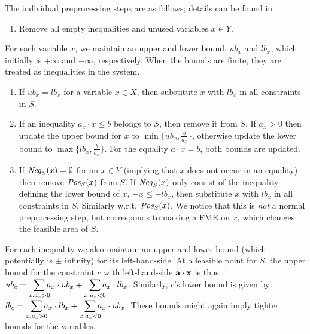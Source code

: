 The individual preprocessing steps are as follows; details can be found in \cite{MyTechRep}.
%
\begin{enumerate} \itemsep0em
	\item Remove all empty inequalities and unused variables $x\in Y$.
\setcounter{counterName}{\value{enumi}}
\end{enumerate}
For each variable $x$, we maintain an upper and lower bound, $ub_x$ and $lb_x$, which initially is $+\infty$ and $-\infty$, respectively. When the bounds are finite, they are treated as inequalities in the system.
\begin{enumerate} \itemsep0em
\setcounter{enumi}{\value{counterName}}
	\item If $ub_x = lb_x$ for a variable $x\in X$, then substitute $x$ with $lb_x$ in all constraints in $S$. 
	\item If an inequality $a_x\cdot x \leq b$ belongs to $S$, then remove it from $S$. If $a_x>0$ then update the upper bound for $x$ to $\min\{ub_x,\frac{b}{a_x}\}$, otherwise update the lower bound to $\max\{lb_x,\frac{b}{a_x}\}$.
For the equality $a\cdot x = b$, both bounds are updated.
	\item If $\mathit{Neg}_S(x)=\emptyset$ for an $x\in Y$ (implying that $x$ does not occur in an equality) then remove $\mathit{Pos}_S(x)$ from $S$. If $\mathit{Neg}_S(x)$ only consist of the inequality defining the lower bound of $x$, $-x\leq -lb_x$, then substitute $x$ with $lb_x$ in all constraints in $S$. Similarly w.r.t. $\mathit{Pos}_S(x)$. We notice that this is \emph{not} a normal preprocessing step, but corresponds to making a FME on $x$, which changes the feasible area of $S$. 
\setcounter{counterName}{\value{enumi}}
\end{enumerate}
For each inequality we also maintain an upper and lower bound (which potentially is $\pm$ infinity) for its left-hand-side. At a feasible point for $S$, the upper bound for the constraint $c$ with left-hand-side $\mathbf{a}\cdot\mathbf{x}$ is thus $\mi{ub}_c = \smashoperator[r]{\sum_{x. a_x>0}}a_x\cdot ub_x + \smashoperator[r]{\sum_{x.a_x<0}}a_x\cdot lb_x$. Similarly, $c$'s lower bound is given by $\mi{lb}_c = \smashoperator[r]{\sum_{x.a_x>0}}a_x\cdot lb_x + \smashoperator[r]{\sum_{x.a_x<0}}a_x\cdot ub_x$.
These bounds might again imply tighter bounds for the variables. 
